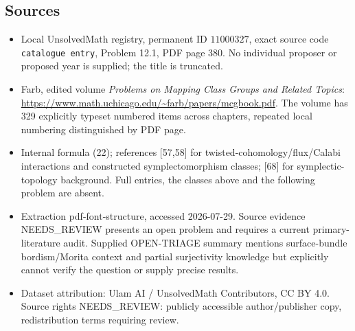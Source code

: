 \documentclass[11pt]{article}
\begin{document}
\subsection{Sources}
\begin{itemize}
\item Local UnsolvedMath registry, permanent ID \(11000327\), exact source code \texttt{catalogue entry}, Problem 12.1, PDF page 380. No individual proposer or proposed year is supplied; the title is truncated.
\item Farb, edited volume \emph{Problems on Mapping Class Groups and Related Topics}: \url{https://www.math.uchicago.edu/~farb/papers/mcgbook.pdf}. The volume has 329 explicitly typeset numbered items across chapters, repeated local numbering distinguished by PDF page.
\item Internal formula (22); references [57,58] for twisted-cohomology/flux/Calabi interactions and constructed symplectomorphism classes; [68] for symplectic-topology background. Full entries, the classes above and the following problem are absent.
\item Extraction pdf-font-structure, accessed 2026-07-29. Source evidence NEEDS\_REVIEW presents an open problem and requires a current primary-literature audit. Supplied OPEN-TRIAGE summary mentions surface-bundle bordism/Morita context and partial surjectivity knowledge but explicitly cannot verify the question or supply precise results.
\item Dataset attribution: Ulam AI / UnsolvedMath Contributors, CC BY 4.0. Source rights NEEDS\_REVIEW: publicly accessible author/publisher copy, redistribution terms requiring review.
\end{itemize}
\end{document}
